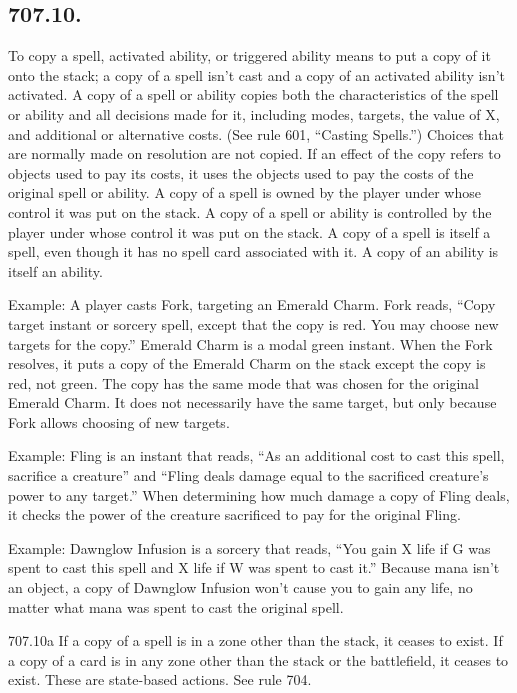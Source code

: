 \subsection*{707.10.}
To copy a spell, activated ability, or triggered ability means to put a copy of it onto the stack; a copy of a spell isn’t cast and a copy of an activated ability isn’t activated. A copy of a spell or ability copies both the characteristics of the spell or ability and all decisions made for it, including modes, targets, the value of X, and additional or alternative costs. (See rule 601, “Casting Spells.”) Choices that are normally made on resolution are not copied. If an effect of the copy refers to objects used to pay its costs, it uses the objects used to pay the costs of the original spell or ability. A copy of a spell is owned by the player under whose control it was put on the stack. A copy of a spell or ability is controlled by the player under whose control it was put on the stack. A copy of a spell is itself a spell, even though it has no spell card associated with it. A copy of an ability is itself an ability.

Example: A player casts Fork, targeting an Emerald Charm. Fork reads, “Copy target instant or sorcery spell, except that the copy is red. You may choose new targets for the copy.” Emerald Charm is a modal green instant. When the Fork resolves, it puts a copy of the Emerald Charm on the stack except the copy is red, not green. The copy has the same mode that was chosen for the original Emerald Charm. It does not necessarily have the same target, but only because Fork allows choosing of new targets.

Example: Fling is an instant that reads, “As an additional cost to cast this spell, sacrifice a creature” and “Fling deals damage equal to the sacrificed creature’s power to any target.” When determining how much damage a copy of Fling deals, it checks the power of the creature sacrificed to pay for the original Fling.

Example: Dawnglow Infusion is a sorcery that reads, “You gain X life if {G} was spent to cast this spell and X life if {W} was spent to cast it.” Because mana isn’t an object, a copy of Dawnglow Infusion won’t cause you to gain any life, no matter what mana was spent to cast the original spell.

707.10a If a copy of a spell is in a zone other than the stack, it ceases to exist. If a copy of a card is in any zone other than the stack or the battlefield, it ceases to exist. These are state-based actions. See rule 704.

